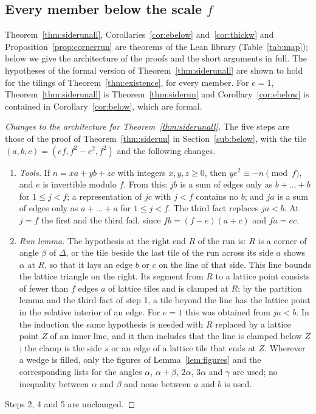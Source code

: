 \documentclass[11pt,reqno]{amsart}
\theoremstyle{plain}
\theoremstyle{definition}
\begin{document}
\subsection{Every member below the scale $f$}\label{sub:allmembers}
Theorem~\ref{thm:siderunall}, Corollaries~\ref{cor:ebelow} and~\ref{cor:thickw} and
Proposition~\ref{prop:cornerrun} are theorems of the Lean library (Table~\ref{tab:map}); below we give the
architecture of the proofs and the short arguments in full. The hypotheses of the formal version of
Theorem~\ref{thm:siderunall} are shown to hold for the tilings of Theorem~\ref{thm:existence}, for every
member. For $e=1$, Theorem~\ref{thm:siderunall} is
Theorem~\ref{thm:siderun} and Corollary~\ref{cor:ebelow} is contained in Corollary~\ref{cor:below}, which
are formal.

\begin{proof}[Changes to the architecture for Theorem~\ref{thm:siderunall}]
The five steps are those of the proof of Theorem~\ref{thm:siderun} in Section~\ref{sub:below}, with the
tile $(a,b,c)=(ef,f^2-e^2,f^2)$ and the following changes.
\begin{enumerate}
\item[1.] \emph{Tools.} If $n=xa+yb+zc$ with integers $x,y,z\ge0$, then $ye^2\equiv-n\pmod f$, and $e$ is
invertible modulo $f$. From this: $jb$ is a sum of edges only as $b+\dots+b$ for $1\le j<f$; a
representation of $jc$ with $j<f$ contains no $b$; and $ja$ is a sum of edges only as $a+\dots+a$ for
$1\le j<f$. The third fact replaces $ja<b$. At $j=f$ the first and the third fail, since
$fb=(f-e)(a+c)$ and $fa=ec$.
\item[3.] \emph{Run lemma.} The hypothesis at the right end $R$ of the run is: $R$ is a corner of angle
$\beta$ of $\Delta$, or the tile beside the last tile of the run across its side $a$ shows $\alpha$ at $R$,
so that it lays an edge $b$ or $c$ on the line of that side. This line bounds the lattice triangle on the
right. Its segment from $R$ to a lattice point consists of fewer than $f$ edges $a$ of lattice tiles and is
clamped at $R$; by the partition lemma and the third fact of step 1, a tile beyond the line has the lattice
point in the relative interior of an edge. For $e=1$ this was obtained from $ja<b$. In the induction the
same hypothesis is needed with $R$ replaced by a lattice point $Z$ of an inner line, and it then includes
that the line is clamped below $Z$; the clamp is the side $s$ or an edge of a lattice tile that ends at $Z$.
Wherever a wedge is filled, only the figures of Lemma~\ref{lem:figures} and the corresponding lists for the
angles $\alpha$, $\alpha+\beta$, $2\alpha$, $3\alpha$ and $\gamma$ are used; no inequality between $\alpha$
and $\beta$ and none between $a$ and $b$ is used.
\end{enumerate}
Steps 2, 4 and 5 are unchanged.
\end{proof}
\end{document}

